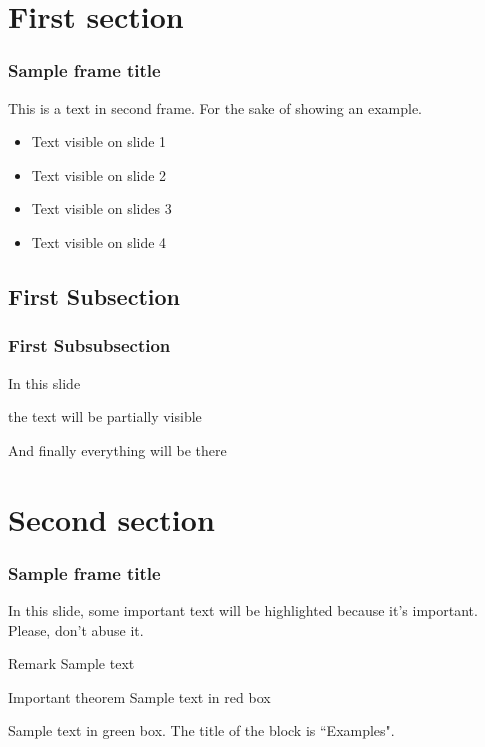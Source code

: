     \section{First section}

    \begin{frame}
    \frametitle{Sample frame title}
    This is a text in second frame. For the sake of showing an example.
    
    \begin{itemize}
        \item<1-> Text visible on slide 1
        \item<2-> Text visible on slide 2
        \item<3> Text visible on slides 3
        \item<4-> Text visible on slide 4
    \end{itemize}
    \end{frame}
    
    
    
    \subsection{First Subsection}
    \subsubsection{First Subsubsection}
    \begin{frame}
    In this slide \pause
    
    the text will be partially visible \pause
    
    And finally everything will be there
    \end{frame}
    
    \section{Second section}
    
    \begin{frame}
    \frametitle{Sample frame title}
    
    In this slide, some important text will be
    \alert{highlighted} because it's important.
    Please, don't abuse it.
    
    \begin{block}{Remark}
    Sample text
    \end{block}
    
    \begin{alertblock}{Important theorem}
    Sample text in red box
    \end{alertblock}
    
    \begin{examples}
    Sample text in green box. The title of the block is ``Examples".
    \end{examples}
    \end{frame}
    
